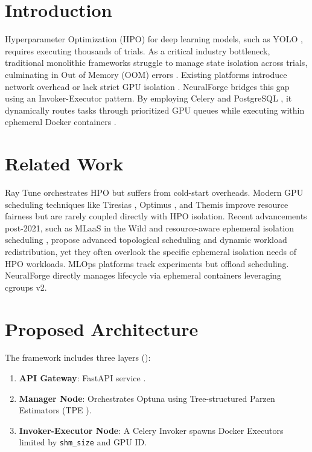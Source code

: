 \documentclass[conference]{IEEEtran}
\begin{document}
\section{Introduction}
Hyperparameter Optimization (HPO) for deep learning models, such as YOLO \cite{jocher2023yolov8}, requires executing thousands of trials. As a critical industry bottleneck, traditional monolithic frameworks struggle to manage state isolation across trials, culminating in Out of Memory (OOM) errors \cite{steiner2023model}. Existing platforms introduce network overhead or lack strict GPU isolation \cite{liaw2018tune, burns2016borg}. NeuralForge bridges this gap using an Invoker-Executor pattern. By employing Celery \cite{sobolev2015celery} and PostgreSQL \cite{momjian2001postgresql}, it dynamically routes tasks through prioritized GPU queues while executing within ephemeral Docker containers \cite{merkel2014docker}.

\section{Related Work}
Ray Tune \cite{liaw2018tune, moritz2018ray} orchestrates HPO but suffers from cold-start overheads. Modern GPU scheduling techniques like Tiresias \cite{gu2019tiresias}, Optimus \cite{peng2020optimus}, and Themis \cite{zhang2020themis} improve resource fairness but are rarely coupled directly with HPO isolation. Recent advancements post-2021, such as MLaaS in the Wild \cite{weng2022mlaas} and resource-aware ephemeral isolation scheduling \cite{zhang2022specon, flowcon2023}, propose advanced topological scheduling and dynamic workload redistribution, yet they often overlook the specific ephemeral isolation needs of HPO workloads. MLOps platforms track experiments but offload scheduling. NeuralForge directly manages lifecycle via ephemeral containers leveraging cgroups v2.




\section{Proposed Architecture}
The framework includes three layers ():
\begin{enumerate}
    \item \textbf{API Gateway}: FastAPI service \cite{fastapi2020}.
    \item \textbf{Manager Node}: Orchestrates Optuna \cite{akiba2019optuna} using Tree-structured Parzen Estimators (TPE \cite{bergstra2011tpe}).
    \item \textbf{Invoker-Executor Node}: A Celery Invoker spawns Docker Executors limited by \texttt{shm\_size} and GPU ID.
\end{enumerate}
\end{document}
